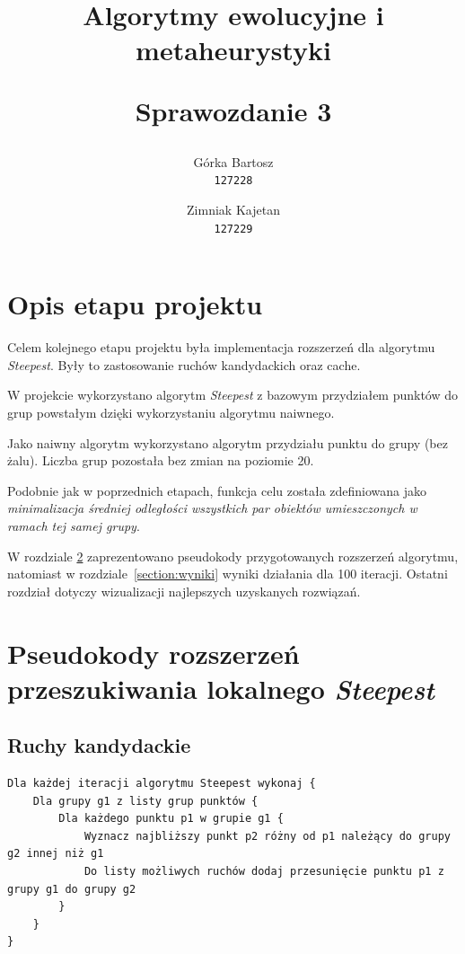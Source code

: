\documentclass[main.tex]{subfiles}
\begin{document}
\title{
    \textbf{Algorytmy ewolucyjne i metaheurystyki}\\
    \begin{large}
        Sprawozdanie 3
    \end{large}
}

\author{
    Górka Bartosz\\
  \texttt{127228}
  \and
  Zimniak Kajetan\\
  \texttt{127229}
}

\date{}

\maketitle

\section{Opis etapu projektu}
Celem kolejnego etapu projektu była implementacja rozszerzeń dla algorytmu \textit{Steepest}. Były to zastosowanie ruchów kandydackich oraz cache.

W projekcie wykorzystano algorytm \textit{Steepest} z bazowym przydziałem punktów do grup powstałym dzięki wykorzystaniu algorytmu naiwnego.

Jako naiwny algorytm wykorzystano algorytm przydziału punktu do grupy (bez żalu). Liczba grup pozostała bez zmian na poziomie 20.

Podobnie jak w poprzednich etapach, funkcja celu została zdefiniowana jako \textit{minimalizacja średniej odległości wszystkich par obiektów umieszczonych w ramach tej samej grupy}.

W rozdziale \ref{section:pseudokody} zaprezentowano pseudokody przygotowanych rozszerzeń algorytmu, natomiast w rozdziale\leavevmode\nobreak\ \ref{section:wyniki} wyniki działania dla 100 iteracji. Ostatni rozdział dotyczy wizualizacji najlepszych uzyskanych rozwiązań.

\section{Pseudokody rozszerzeń przeszukiwania lokalnego \textit{Steepest}}
\label{section:pseudokody}
\subsection{Ruchy kandydackie}
\begin{verbatim}
Dla każdej iteracji algorytmu Steepest wykonaj {
    Dla grupy g1 z listy grup punktów {
        Dla każdego punktu p1 w grupie g1 {
            Wyznacz najbliższy punkt p2 różny od p1 należący do grupy g2 innej niż g1
            Do listy możliwych ruchów dodaj przesunięcie punktu p1 z grupy g1 do grupy g2
        }
    }
}
\end{verbatim}
\end{document}
